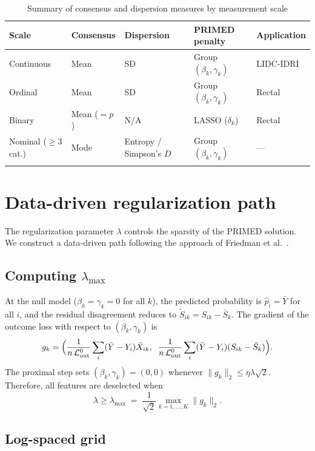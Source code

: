 \documentclass[referee,lineno,pdflatex,sn-vancouver-num]{sn-jnl}
\begin{document}
\begin{appendices}
\begin{table}[h]
\caption{Summary of consensus and dispersion measures by measurement scale}\label{tab:scale_summary}
\footnotesize
\renewcommand{\arraystretch}{1.3}
\begin{tabular*}{\textwidth}{@{\extracolsep\fill}lll p{} l}
\toprule
Scale & Consensus & Dispersion & PRIMED penalty & Application \\
\midrule
Continuous & Mean & SD & Group $(\beta_k, \gamma_k)$ & LIDC-IDRI \\
Ordinal & Mean & SD & Group $(\beta_k, \gamma_k)$ & Rectal \\
Binary & Mean ($= p$) & N/A & LASSO ($\delta_k$) & Rectal \\
Nominal ($\geq$3 cat.) & Mode & Entropy / Simpson's $D$ & Group $(\beta_k, \gamma_k)$ & --- \\
\botrule
\end{tabular*}
\end{table}

\section{Data-driven regularization path}\label{secA_lambda}

The regularization parameter $\lambda$ controls the sparsity of the PRIMED solution.
We construct a data-driven path following the approach of Friedman et al.\ \cite{Friedman2010}.

\subsection{Computing $\lambda_{\max}$}

At the null model ($\beta_k = \gamma_k = 0$ for all $k$), the predicted probability is $\hat p_i = \bar Y$ for all $i$, and the residual disagreement reduces to $\tilde S_{ik} = S_{ik} - \bar S_k$.
The gradient of the outcome loss with respect to $(\beta_k, \gamma_k)$ is
\[
  g_k = \Bigl(\frac{1}{n\,\mathcal{L}_{\mathrm{out}}^0}\sum_i (\bar Y - Y_i)\bar X_{ik},\;\;
        \frac{1}{n\,\mathcal{L}_{\mathrm{out}}^0}\sum_i (\bar Y - Y_i)(S_{ik} - \bar S_k)\Bigr).
\]
The proximal step sets $(\beta_k, \gamma_k) = (0,0)$ whenever $\|g_k\|_2 \leq \eta\lambda\sqrt{2}$.
Therefore, all features are deselected when
\[
  \lambda \geq \lambda_{\max} \;=\; \frac{1}{\sqrt{2}}\max_{k=1,\dots,K} \|g_k\|_2.
\]

\subsection{Log-spaced grid}


\end{appendices}
\end{document}

